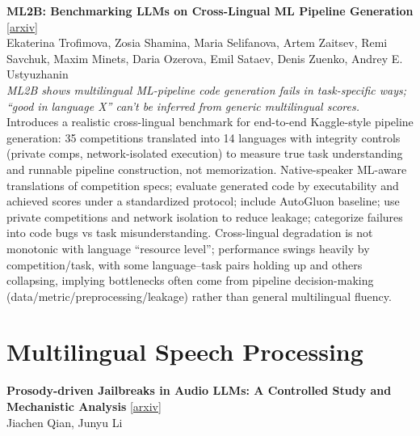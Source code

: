 \documentclass[12pt,letterpaper]{article}
\begin{document}
\medskip

{\small\textbf{ML2B: Benchmarking LLMs on Cross-Lingual ML Pipeline Generation}} {\scriptsize[\href{https://arxiv.org/abs/2509.22768}{arxiv}]}\\
{\scriptsize Ekaterina Trofimova, Zosia Shamina, Maria Selifanova, Artem Zaitsev, Remi Savchuk, Maxim Minets, Daria Ozerova, Emil Sataev, Denis Zuenko, Andrey E. Ustyuzhanin}\\

{\small\textit{ML2B shows multilingual ML-pipeline code generation fails in task-specific ways; ``good in language X'' can't be inferred from generic multilingual scores.}}\\[1pt]
{\footnotesize Introduces a realistic cross-lingual benchmark for end-to-end Kaggle-style pipeline generation: 35 competitions translated into 14 languages with integrity controls (private comps, network-isolated execution) to measure true task understanding and runnable pipeline construction, not memorization. Native-speaker ML-aware translations of competition specs; evaluate generated code by executability and achieved scores under a standardized protocol; include AutoGluon baseline; use private competitions and network isolation to reduce leakage; categorize failures into code bugs vs task misunderstanding. Cross-lingual degradation is not monotonic with language ``resource level''; performance swings heavily by competition/task, with some language--task pairs holding up and others collapsing, implying bottlenecks often come from pipeline decision-making (data/metric/preprocessing/leakage) rather than general multilingual fluency.}

\medskip


\section*{Multilingual Speech Processing}

{\small\textbf{Prosody-driven Jailbreaks in Audio LLMs: A Controlled Study and Mechanistic Analysis}} {\scriptsize[\href{https://arxiv.org/abs/2607.26541}{arxiv}]}\\
{\scriptsize Jiachen Qian, Junyu Li}\\
\end{document}
